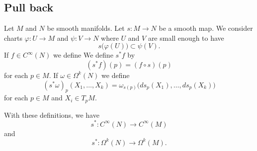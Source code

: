 
\subsection{Pull back}

\begin{proposition}		\label{PROPooLEYOooJfPtmB}
Let \( M\) and \( N\) be smooth manifolds. Let \(s \colon M\to N  \) be a smooth map. We consider charts \(\varphi \colon U\to M  \) and \(\psi \colon V\to N  \) where \( U\) and \( V\) are small enough to have
\begin{equation}
s\big( \varphi(U) \big)\subset \psi(V).
\end{equation}
If \( f\in C^{\infty}(N)\) we define
We define \( s^*f\) by
\begin{equation}
(s^*f)(p)=(f\circ s)(p)
	\end{equation}
	for each \( p\in M\). If \( \omega\in \Omega^k(N)\) we define
	\begin{equation}		\label{EQooCQBJooQpJYUf}
(s^*\omega)_p(X_1,\ldots,X_k)  = \omega_{s(p)}\big( ds_p(X_1),\ldots,ds_p(X_k) \big)
	\end{equation}
	for each \( p\in M\) and \( X_i\in T_pM\).

	With these definitions, we have
	\begin{equation}
s^* \colon C^{\infty}(N)\to C^{\infty}(M)
	\end{equation}
	and
	\begin{equation}
	s^* \colon \Omega^k(N)\to \Omega^k(M).
	\end{equation}
	\end{proposition}

